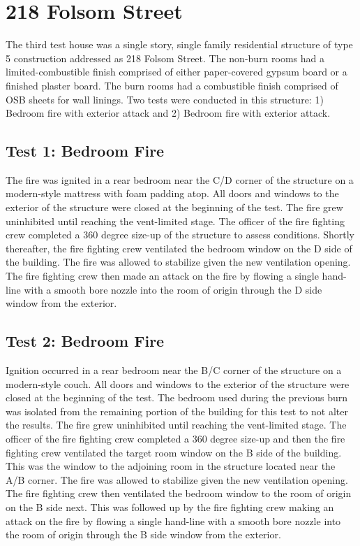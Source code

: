 \documentclass[12pt,oneside]{book}
\begin{document}
\section{218 Folsom Street}

The third test house was a single story, single family residential structure of type 5 construction addressed as 218 Folsom Street. The non-burn rooms had a limited-combustible finish comprised of either paper-covered gypsum board or a finished plaster board. The burn rooms had a combustible finish comprised of OSB sheets for wall linings. Two tests were conducted in this structure: 1) Bedroom fire with exterior attack and 2) Bedroom fire with exterior attack. 

\subsection{Test 1: Bedroom Fire}

The fire was ignited in a rear bedroom near the C/D corner of the structure on a modern-style mattress with foam padding atop. All doors and windows to the exterior of the structure were closed at the beginning of the test. The fire grew uninhibited until reaching the vent-limited stage. The officer of the fire fighting crew completed a 360 degree size-up of the structure to assess conditions. Shortly thereafter, the fire fighting crew ventilated the bedroom window on the D side of the building. The fire was allowed to stabilize given the new ventilation opening. The fire fighting crew then made an attack on the fire by flowing a single hand-line with a smooth bore nozzle into the room of origin through the D side window from the exterior.

\subsection{Test 2: Bedroom Fire}

Ignition occurred in a rear bedroom near the B/C corner of the structure on a modern-style couch. All doors and windows to the exterior of the structure were closed at the beginning of the test. The bedroom used during the previous burn was isolated from the remaining portion of the building for this test to not alter the results. The fire grew uninhibited until reaching the vent-limited stage. The officer of the fire fighting crew completed a 360 degree size-up and then the fire fighting crew ventilated the target room window on the B side of the building. This was the window to the adjoining room in the structure located near the A/B corner. The fire was allowed to stabilize given the new ventilation opening. The fire fighting crew then ventilated the bedroom window to the room of origin on the B side next. This was followed up by the fire fighting crew making an attack on the fire by flowing a single hand-line with a smooth bore nozzle into the room of origin through the B side window from the exterior.
\end{document}
